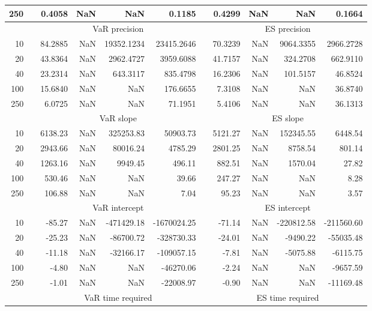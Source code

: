 {\begin{table}[h]
\begin{tabular}{rr rrrr r rrrr}
250 && 0.4058  &    NaN  &    NaN & 0.1185 && 0.4299  &    NaN  &    NaN & 0.1664 \\ 
\hline 
 & & \multicolumn{4}{c}{VaR precision} &&  \multicolumn{4}{c}{ES precision} \\ \cline{3-6}  \cline{8-11}
10 && 84.2885  &    NaN  & 19352.1234 & 23415.2646 & & 70.3239  &    NaN  & 9064.3355 & 2966.2728 \\ 
20 && 43.8364  &    NaN  & 2962.4727 & 3959.6088 & & 41.7157  &    NaN  & 324.2708 & 662.9110 \\ 
40 && 23.2314  &    NaN  & 643.3117 & 835.4798 & & 16.2306  &    NaN  & 101.5157 & 46.8524 \\ 
100 && 15.6840  &    NaN  &    NaN & 176.6655 & & 7.3108  &    NaN  &    NaN & 36.8740 \\ 
250 && 6.0725  &    NaN  &    NaN & 71.1951 & & 5.4106  &    NaN  &    NaN & 36.1313 \\ 
\hline 
 & & \multicolumn{4}{c}{ VaR slope} &&  \multicolumn{4}{c}{ES slope} \\ \cline{3-6}  \cline{8-11}
10 && 6138.23  &  NaN  & 325253.83 & 50903.73 && 5121.27  &  NaN  & 152345.55 & 6448.54 \\ 
20 && 2943.66  &  NaN  & 80016.24 & 4785.29 && 2801.25  &  NaN  & 8758.54 & 801.14 \\ 
40 && 1263.16  &  NaN  & 9949.45 & 496.11 && 882.51  &  NaN  & 1570.04 & 27.82 \\ 
100 && 530.46  &  NaN  &  NaN & 39.66 && 247.27  &  NaN  &  NaN & 8.28 \\ 
250 && 106.88  &  NaN  &  NaN & 7.04 && 95.23  &  NaN  &  NaN & 3.57 \\ 
\hline 
 & & \multicolumn{4}{c}{ VaR intercept} &&  \multicolumn{4}{c}{ES intercept} \\ \cline{3-6}  \cline{8-11}
10 && -85.27  &  NaN  & -471429.18 & -1670024.25 && -71.14  &  NaN  & -220812.58 & -211560.60 \\ 
20 && -25.23  &  NaN  & -86700.72 & -328730.33 && -24.01  &  NaN  & -9490.22 & -55035.48 \\ 
40 && -11.18  &  NaN  & -32166.17 & -109057.15 && -7.81  &  NaN  & -5075.88 & -6115.75 \\ 
100 && -4.80  &  NaN  &  NaN & -46270.06 && -2.24  &  NaN  &  NaN & -9657.59 \\ 
250 && -1.01  &  NaN  &  NaN & -22008.97 && -0.90  &  NaN  &  NaN & -11169.48 \\ 
\hline 
 & & \multicolumn{4}{c}{VaR time required} && \multicolumn{4}{c}{ES time required} \\ \cline{3-6}  \cline{8-11}

\end{tabular}
\end{table}}
